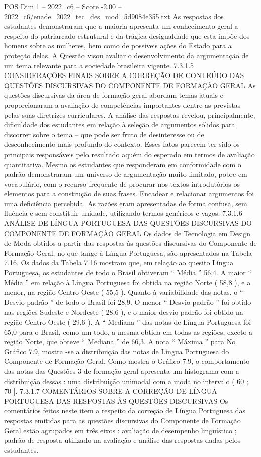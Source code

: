 \begin{textsample}{POS Dim 1 – 2022\_c6 – Score -2.00 – 2022\_c6/enade\_2022\_tec\_des\_mod\_5d9084e355.txt}
As respostas dos estudantes demonstraram que a maioria apresenta um conhecimento geral a respeito do patriarcado estrutural e da trágica desigualdade que esta impõe dos homens sobre as mulheres, bem como de possíveis ações do Estado para a proteção delas.
A Questão visou avaliar o desenvolvimento da argumentação de um tema relevante para a sociedade brasileira vigente. 7.3.1.5 CONSIDERAÇÕES FINAIS SOBRE A CORREÇÃO DE CONTEÚDO DAS QUESTÕES DISCURSIVAS DO COMPONENTE DE FORMAÇÃO GERAL As questões discursivas da área de formação geral abordam temas atuais e proporcionaram a avaliação de competências importantes dentre as previstas pelas suas diretrizes curriculares.
A análise das respostas revelou, principalmente, dificuldade dos estudantes em relação à seleção de argumentos sólidos para discorrer sobre o tema – que pode ser fruto de desinteresse ou de desconhecimento mais profundo do contexto.
Esses fatos parecem ter sido os principais responsáveis pelo resultado aquém do esperado em termos de avaliação quantitativa.
Mesmo os estudantes que responderam em conformidade com o padrão demonstraram um universo de argumentação muito limitado, pobre em vocabulário, com o recurso frequente de procurar nos textos introdutórios os elementos para a construção de suas frases.
Encadear e relacionar argumentos foi uma deficiência percebida.
As razões eram apresentadas de forma confusa, sem fluência e sem constituir unidade, utilizando termos genéricos e vagos. 7.3.1.6 ANÁLISE DE LÍNGUA PORTUGUESA DAS QUESTÕES DISCURSIVAS DO COMPONENTE DE FORMAÇÃO GERAL Os dados de Tecnologia em Design de Moda obtidos a partir das respostas às questões discursivas do Componente de Formação Geral, no que tange à Língua Portuguesa, são apresentados na Tabela 7.16.
Os dados da Tabela 7.16 mostram que, em relação ao quesito Língua Portuguesa, os estudantes de todo o Brasil obtiveram “ Média ” 56,4.
A maior “ Média ” em relação à Língua Portuguesa foi obtida na região Norte ( 58,8 ), e a menor, na região Centro-Oeste ( 55,5 ).
Quanto à variabilidade das notas, o “ Desvio-padrão ” de todo o Brasil foi 28,9.
O menor “ Desvio-padrão ” foi obtido nas regiões Sudeste e Nordeste ( 28,6 ), e o maior desvio-padrão foi obtido na região Centro-Oeste ( 29,6 ).
A “ Mediana ” das notas de Língua Portuguesa foi 65,0 para o Brasil, como um todo, a mesma obtida em todas as regiões, exceto a região Norte, que obteve “ Mediana ” de 66,3.
A nota “ Máxima ” para No Gráfico 7.9, mostra -se a distribuição das notas de Língua Portuguesa do Componente de Formação Geral.
Como mostra o Gráfico 7.9, o comportamento das notas das Questões 3 de formação geral apresenta um histograma com a distribuição dessas : uma distribuição unimodal com a moda no intervalo ( 60 ; 70 ]. 7.3.1.7 COMENTÁRIOS SOBRE A CORREÇÃO DE LÍNGUA PORTUGUESA DAS RESPOSTAS ÀS QUESTÕES DISCURSIVAS Os comentários feitos neste item a respeito da correção de Língua Portuguesa das respostas emitidas para as questões discursivas do Componente de Formação Geral estão agrupados em três eixos : avaliação de desempenho linguístico ; padrão de resposta utilizado na avaliação e análise das respostas dadas pelos estudantes.

\end{textsample}
